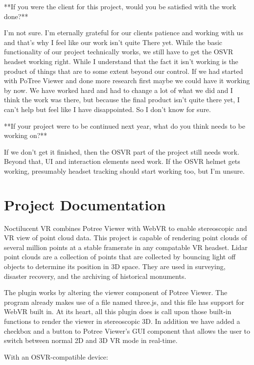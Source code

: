 \documentclass[draftclsnofoot,onecolumn]{IEEEtran}
\begin{document}
**If you were the client for this project, would you be satisfied with the work done?**

I'm not sure. I'm eternally grateful for our clients patience and working with us and that's why I feel like our work isn't quite There yet. While the basic functionality of our project technically works, we still have to get the OSVR headset working right. While I understand that the fact it isn't working is the product of things that are to some extent beyond our control. If we had started with PoTree Viewer and done more research first maybe we could have it working by now. We have worked hard and had to change a lot of what we did and I think the work was there, but because the final product isn't quite there yet, I can't help but feel like I have disappointed. So I don't know for sure.

**If your project were to be continued next year, what do you think needs to be working on?**

If we don't get it finished, then the OSVR part of the project still needs work. Beyond that, UI and interaction elements need work. If the OSVR helmet gets working, presumably headset tracking should start working too, but I'm unsure. 

\section{Project Documentation}

Noctilucent VR combines Potree Viewer with WebVR to enable stereoscopic and VR view of point cloud data. 
This project is capable of rendering point clouds of several million points at a stable framerate in any compatable VR headset. 
Lidar point clouds are a collection of points that are collected by bouncing light off objects to determine its position in 3D space. 
They are used in surveying, disaster recovery, and the archiving of historical monuments.

The plugin works by altering the viewer component of Potree Viewer. 
The program already makes use of a file named three.js, and this file has support for WebVR built in. 
At its heart, all this plugin does is call upon those built-in functions to render the viewer in stereoscopic 3D. 
In addition we have added a checkbox and a button to Potree Viewer's GUI component that allows the user to switch between normal 2D and 3D VR mode in real-time.

With an OSVR-compatible device:
\end{document}
